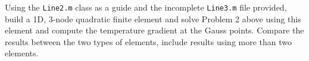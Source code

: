 Using the \texttt{Line2.m} class as a guide and the incomplete \texttt{Line3.m} file provided, build a 1D, 3-node quadratic finite element and solve Problem 2 above using this element and compute the temperature gradient at the Gauss points. Compare the results between the two types of elements, include results using more than two elements.